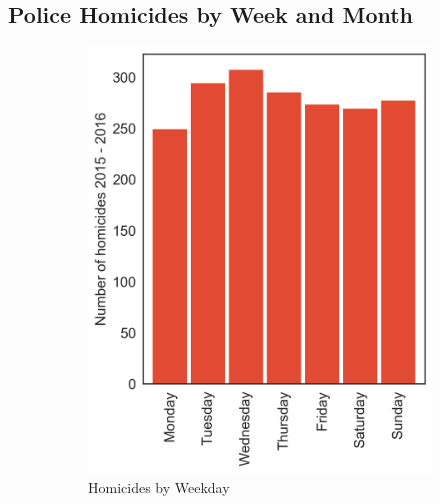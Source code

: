 \documentclass[12pt, titlepage]{article}
\begin{document}
\subsection{Police Homicides by Week and Month}

\begin{figure}[ht!]
    \centering  
    \begin{subfigure}[t]{0.5\textwidth}
        \centering
        \includegraphics[width=.9\textwidth]{assets/week_month_frequency_(iva).png}
        \caption{Homicides by Weekday}
    \end{subfigure}%
    ~ 
    \begin{subfigure}[t]{0.5\textwidth}
        \centering

\end{subfigure}
\end{figure}
\end{document}

